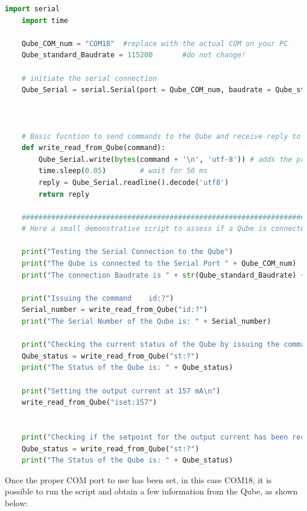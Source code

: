 \begin{lstlisting}[language=Python]
    import serial
    import time
    
    Qube_COM_num = "COM18"  #replace with the actual COM on your PC
    Qube_standard_Baudrate = 115200       #do not change!
    
    # initiate the serial connection
    Qube_Serial = serial.Serial(port = Qube_COM_num, baudrate = Qube_standard_Baudrate, timeout=0.6)
    
    
    
    # Basic fucntion to send commands to the Qube and receive reply to queries, if any
    def write_read_from_Qube(command):
        Qube_Serial.write(bytes(command + '\n', 'utf-8')) # adds the proper terminating character
        time.sleep(0.05)        # wait for 50 ms
        reply = Qube_Serial.readline().decode('utf8')
        return reply
    
    ########################################################################
    # Here a small demonstrative script to assess if a Qube is connected and working
    
    print("Testing the Serial Connection to the Qube")
    print("The Qube is connected to the Serial Port " + Qube_COM_num)
    print("The connection Baudrate is " + str(Qube_standard_Baudrate) + "\n")
    
    print("Issuing the command    id:?")
    Serial_number = write_read_from_Qube("id:?")
    print("The Serial Number of the Qube is: " + Serial_number)
    
    print("Checking the current status of the Qube by issuing the command   st:?\n")
    Qube_status = write_read_from_Qube("st:?")
    print("The Status of the Qube is: " + Qube_status)
    
    print("Setting the output current at 157 mA\n")
    write_read_from_Qube("iset:157")
    
    
    print("Checking if the setpoint for the output current has been received by issuing the command   st:?\n")
    Qube_status = write_read_from_Qube("st:?")
    print("The Status of the Qube is: " + Qube_status)
\end{lstlisting}

\newpage Once the proper COM port to use has been set, in this case COM18, it is possible to run the script and obtain a few information from the Qube, as shown below:

